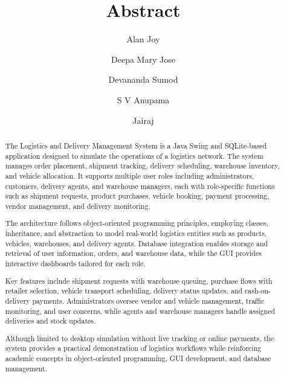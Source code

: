 \documentclass[12pt,a4paper]{article}
\begin{document}
\title{\textbf{Abstract}}
\author{
  Alan Joy \and
  Deepa Mary Jose \and
  Devananda Sumod \and
  S V Anupama \and
  Jairaj
}
\date{}
\maketitle

\begin{abstract}
The Logistics and Delivery Management System is a Java Swing and SQLite-based application designed to simulate the operations of a logistics network. The system manages order placement, shipment tracking, delivery scheduling, warehouse inventory, and vehicle allocation. It supports multiple user roles including administrators, customers, delivery agents, and warehouse managers, each with role-specific functions such as shipment requests, product purchases, vehicle booking, payment processing, vendor management, and delivery monitoring.

The architecture follows object-oriented programming principles, employing classes, inheritance, and abstraction to model real-world logistics entities such as products, vehicles, warehouses, and delivery agents. Database integration enables storage and retrieval of user information, orders, and warehouse data, while the GUI provides interactive dashboards tailored for each role.

Key features include shipment requests with warehouse queuing, purchase flows with retailer selection, vehicle transport scheduling, delivery status updates, and cash-on-delivery payments. Administrators oversee vendor and vehicle management, traffic monitoring, and user concerns, while agents and warehouse managers handle assigned deliveries and stock updates.

Although limited to desktop simulation without live tracking or online payments, the system provides a practical demonstration of logistics workflows while reinforcing academic concepts in object-oriented programming, GUI development, and database management.
\end{abstract}
\end{document}
